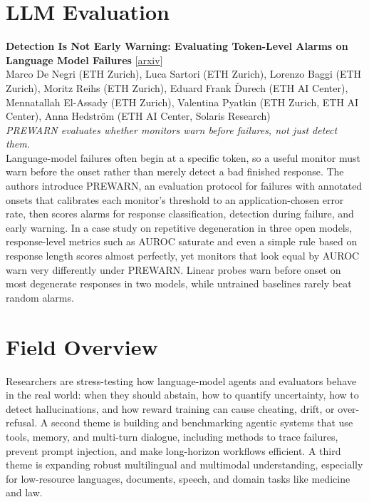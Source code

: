 \documentclass[12pt,letterpaper]{article}
\begin{document}
\medskip
\section*{LLM Evaluation}
\begin{minipage}{\linewidth}
{\small\textbf{Detection Is Not Early Warning: Evaluating Token-Level Alarms on Language Model Failures}} {\scriptsize[\href{https://arxiv.org/abs/2611.16803}{arxiv}]}\\
{\scriptsize Marco De Negri (ETH Zurich), Luca Sartori (ETH Zurich), Lorenzo Baggi (ETH Zurich), Moritz Reihs (ETH Zurich), Eduard Frank \v{D}urech (ETH AI Center), Mennatallah El-Assady (ETH Zurich), Valentina Pyatkin (ETH Zurich, ETH AI Center), Anna Hedstr\"om (ETH AI Center, Solaris Research)}\\
{\footnotesize\textit{PREWARN evaluates whether monitors warn before failures, not just detect them.}}\\[2pt]
{\footnotesize Language-model failures often begin at a specific token, so a useful monitor must warn before the onset rather than merely detect a bad finished response. The authors introduce PREWARN, an evaluation protocol for failures with annotated onsets that calibrates each monitor's threshold to an application-chosen error rate, then scores alarms for response classification, detection during failure, and early warning. In a case study on repetitive degeneration in three open models, response-level metrics such as AUROC saturate and even a simple rule based on response length scores almost perfectly, yet monitors that look equal by AUROC warn very differently under PREWARN. Linear probes warn before onset on most degenerate responses in two models, while untrained baselines rarely beat random alarms.}
\end{minipage}

\medskip
\section*{Field Overview}
{\footnotesize Researchers are stress-testing how language-model agents and evaluators behave in the real world: when they should abstain, how to quantify uncertainty, how to detect hallucinations, and how reward training can cause cheating, drift, or over-refusal. A second theme is building and benchmarking agentic systems that use tools, memory, and multi-turn dialogue, including methods to trace failures, prevent prompt injection, and make long-horizon workflows efficient. A third theme is expanding robust multilingual and multimodal understanding, especially for low-resource languages, documents, speech, and domain tasks like medicine and law.}
\end{document}

